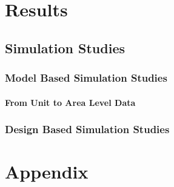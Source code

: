 



\part{Results}\label{part:results}

\chapter{Simulation Studies}
\section{Model Based Simulation Studies}


\subsection{From Unit to Area Level Data}


\section{Design Based Simulation Studies}



\appendix

\part{Appendix} %



\cleardoublepage %





